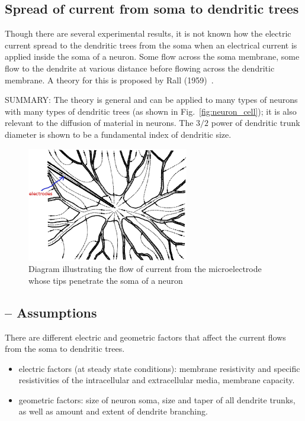 \subsection{Spread of current from soma to dendritic trees}
\label{sec:spread-current-from}

Though there are several experimental results, it is not known how the
electric current spread to the dendritic trees from the soma when an
electrical current is applied inside the soma of a neuron. Some flow
across the soma membrane, some flow to the dendrite at various
distance before flowing across the dendritic membrane. A theory for
this is proposed by Rall (1959)~\cite{rall1959bdt}.

SUMMARY: The theory is general and can be applied to many types of
neurons with many types of dendritic trees (as shown in
Fig.~\ref{fig:neuron_cell}); it is also relevant to the diffusion of
material in neurons. The $3/2$ power of dendritic trunk diameter is
shown to be a fundamental index of dendritic size.
\begin{figure}[hbt]
  \centerline{\includegraphics[height=5cm,
    angle=0]{./images/somacurrent_flow.eps}}
\caption{Diagram illustrating the flow of current from the
  microelectrode whose tips penetrate the soma of a neuron}
\label{fig:current_flow}
\end{figure}

\subsection{-- Assumptions}
\label{sec:assumptions-3}

There are different electric and geometric factors that affect the
current flows from the soma to dendritic trees.

\begin{itemize}
\item electric factors (at steady state conditions): membrane
  resistivity and specific resistivities of the intracellular and
  extracellular media, membrane capacity.

\item geometric factors: size of neuron soma, size and taper of all
  dendrite trunks, as well as amount and extent of dendrite
  branching. 
\end{itemize}

